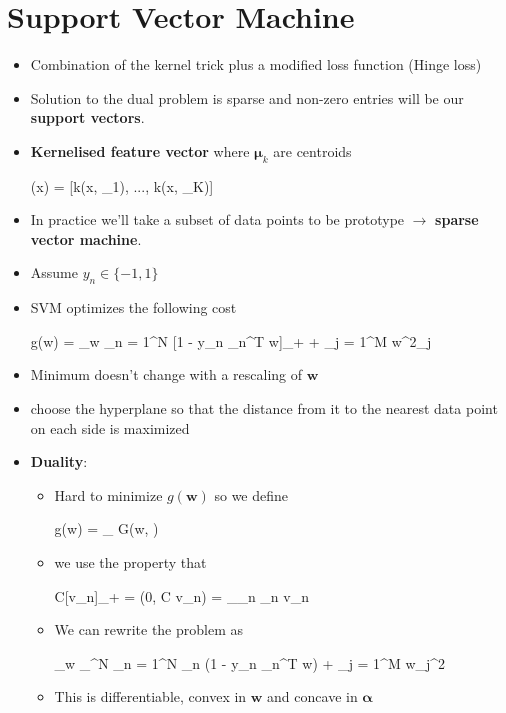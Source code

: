 \section{Support Vector Machine} 
\begin{itemize}
	\item Combination of the kernel trick plus a modified loss function (Hinge loss)
	\item Solution to the dual problem is sparse and non-zero entries will be our \textbf{support vectors}.
	\item \textbf{Kernelised feature vector} where $\bm \mu_k$ are centroids
	\begin{myalign*}
	    \bm \phi(\*x) = [k(\*x, \bm \mu_1), ..., k(\*x, \bm \mu_K)]
	\end{myalign*}
	\item In practice we'll take a subset of data points to be prototype $\rightarrow$ \textbf{sparse vector machine}.
	\item Assume $y_n \in \{-1, 1\}$
	\item SVM optimizes the following cost
	\begin{myalign*}
	    g(\bm w) = \min_{\bm w} \sum_{n = 1}^N [1 - y_n \tilde{\bm \phi}_n^T \bm w]_+ +  \sum_{j = 1}^M w^2_j
	\end{myalign*}
	\item Minimum doesn't change with a rescaling of $\bm w$
	\item choose the hyperplane so that the distance from it to the nearest data point on each side is maximized
	\item \textbf{Duality}:
	\begin{itemize}
		\item Hard to minimize $g(\bm w)$ so we define
		\begin{myalign*}
		    g(\bm w) = \max_{\bm \alpha} G(\bm w, \bm \alpha)
		\end{myalign*}
		\item we use the property that
		\begin{myalign*}
		    C[v_n]_+ = \max(0, C v_n) = \max_{\alpha_n \in [0, C]} \alpha_n v_n
		\end{myalign*}
		\item We can rewrite the problem as
		\begin{myalign*}
		    \min_{\bm w} \max_{\bm \alpha \in [0, C]^N} \sum_{n = 1}^N \alpha_n (1 - y_n \tilde{\bm \phi}_n^T \bm w) +  \sum_{j = 1}^M w_j^2
		\end{myalign*}
		\item This is differentiable, convex in $\bm w$ and concave in $\bm \alpha$

\end{itemize}
\end{itemize}
